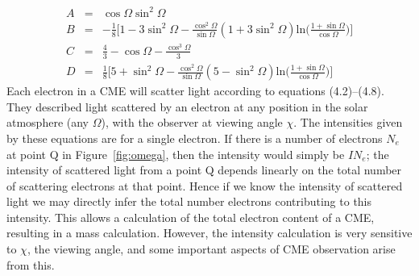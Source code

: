 \begin{eqnarray}
A &=& \cos \Omega \sin^2 \Omega \\
%
B &=& -\frac{1}{8}\bigg[1 - 3\sin^2\Omega -\frac{\cos^2\Omega}{\sin\Omega}(1+3\sin^2\Omega)\textrm{ln}\bigg(\frac{1+\sin\Omega}{\cos\Omega}\bigg)\bigg] \\
%
C &=& \frac{4}{3} - \cos\Omega - \frac{\cos^3\Omega}{3} \\
%
D &=& \frac{1}{8}\bigg[5 + \sin^2\Omega -\frac{\cos^2\Omega}{\sin\Omega}(5-\sin^2\Omega)\textrm{ln}\bigg(\frac{1+\sin\Omega}{\cos\Omega}\bigg)\bigg] 
\end{eqnarray}
Each electron in a CME will scatter light according to equations (4.2)--(4.8). They described light scattered by an electron at any position in the solar atmosphere (any $\Omega$), with the observer at viewing angle $\chi$. The intensities given by these equations are for a single electron. If there is a number of electrons $N_e$ at point Q in Figure~\ref{fig:omega}, then the intensity would simply be $IN_e$; the intensity of scattered light from a point Q depends linearly on the total number of scattering electrons at that point. Hence if we know the intensity of scattered light we may directly infer the total number electrons contributing to this intensity. This allows a calculation of the total electron content of a CME, resulting in a mass calculation. However, the intensity calculation is very sensitive to $\chi$, the viewing angle, and some important aspects of CME observation arise from this.


